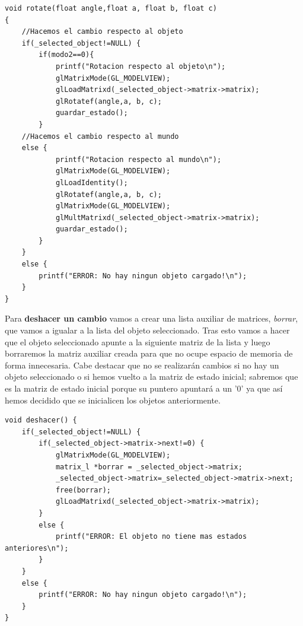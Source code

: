 \documentclass[12pt,a4paper]{article}
\begin{document}
\begin{enumerate}
\begin{lstlisting}
void rotate(float angle,float a, float b, float c)
{
    //Hacemos el cambio respecto al objeto
    if(_selected_object!=NULL) {
        if(modo2==0){
            printf("Rotacion respecto al objeto\n");
            glMatrixMode(GL_MODELVIEW);
            glLoadMatrixd(_selected_object->matrix->matrix);
            glRotatef(angle,a, b, c);
            guardar_estado();
        }
    //Hacemos el cambio respecto al mundo
    else {
            printf("Rotacion respecto al mundo\n");
            glMatrixMode(GL_MODELVIEW);
            glLoadIdentity();
            glRotatef(angle,a, b, c);
            glMatrixMode(GL_MODELVIEW);
            glMultMatrixd(_selected_object->matrix->matrix);
            guardar_estado();
        }   
    }
    else {
        printf("ERROR: No hay ningun objeto cargado!\n");
    }
}
\end{lstlisting}





Para \textbf{deshacer un cambio} vamos a crear una lista auxiliar de matrices, \textit{borrar}, que vamos a igualar a la lista del objeto seleccionado. Tras esto vamos a hacer que el objeto seleccionado apunte a la siguiente matriz de la lista y luego borraremos la matriz auxiliar creada para que no ocupe espacio de memoria de forma innecesaria.\newline
Cabe destacar que no se realizarán cambios si no hay un objeto seleccionado o si hemos vuelto a la matriz de estado inicial; sabremos que es la matriz de estado inicial porque su puntero apuntará a un '0' ya que así hemos decidido que se inicialicen los objetos anteriormente.\newline

\begin{lstlisting}
void deshacer() {
    if(_selected_object!=NULL) {
		if(_selected_object->matrix->next!=0) {
			glMatrixMode(GL_MODELVIEW);
			matrix_l *borrar = _selected_object->matrix;
			_selected_object->matrix=_selected_object->matrix->next;
			free(borrar);
			glLoadMatrixd(_selected_object->matrix->matrix);
		}
		else {
			printf("ERROR: El objeto no tiene mas estados anteriores\n");
		}
	}
    else {
        printf("ERROR: No hay ningun objeto cargado!\n");
    }
}
\end{lstlisting}
\end{enumerate}
\end{document}
